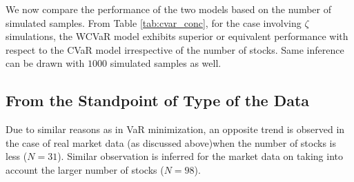 We now compare the performance of the two models based on the number of simulated samples. From Table \ref{tab:cvar_conc}, for the case involving $\zeta$ simulations, the WCVaR model exhibits superior or equivalent performance with respect to the CVaR model irrespective of the number of stocks. Same inference can be drawn with $1000$ simulated samples as well.  

\subsection{From the Standpoint of Type of the Data}

Due to similar reasons as in VaR minimization, an opposite trend is observed in the case of real market data (as discussed above)when the number of stocks is less ($N=31$). Similar observation is inferred for the market data on taking into account the larger number of stocks ($N=98$). 





